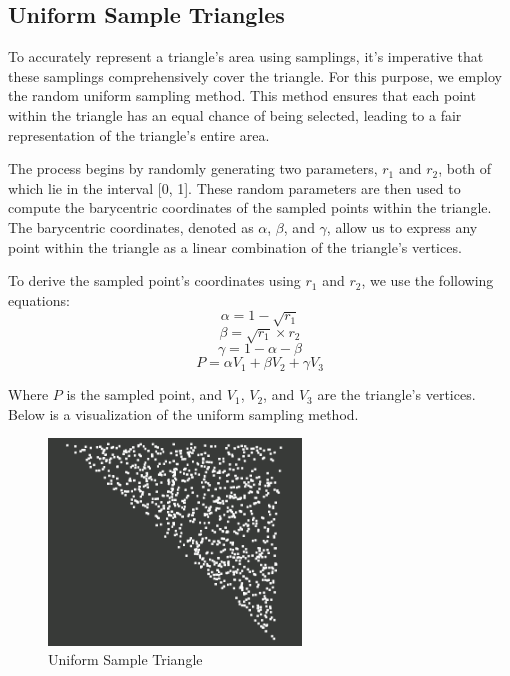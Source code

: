 \documentclass[11pt, a4paper,oneside,chapterprefix=false]{scrbook}
\begin{document}
\subsection{Uniform Sample Triangles}

To accurately represent a triangle's area using samplings, it's imperative that these samplings comprehensively cover the triangle. For this purpose, we employ the random uniform sampling method. This method ensures that each point within the triangle has an equal chance of being selected, leading to a fair representation of the triangle's entire area.

\vspace{10pt}

The process begins by randomly generating two parameters, \( r_1 \) and \( r_2 \), both of which lie in the interval [0, 1]. These random parameters are then used to compute the barycentric coordinates of the sampled points within the triangle. The barycentric coordinates, denoted as \( \alpha \), \( \beta \), and \( \gamma \), allow us to express any point within the triangle as a linear combination of the triangle's vertices.

\vspace{10pt}

To derive the sampled point's coordinates using \( r_1 \) and \( r_2 \), we use the following equations:
\[ \alpha = 1 - \sqrt{r_1} \]
\[ \beta = \sqrt{r_1} \times r_2 \]
\[ \gamma = 1 - \alpha - \beta \]
\[ P = \alpha V_1 + \beta V_2 + \gamma V_3 \]

Where \( P \) is the sampled point, and \( V_1 \), \( V_2 \), and \( V_3 \) are the triangle's vertices. Below is a visualization of the uniform sampling method.

\begin{minipage}{\textwidth}
	\begin{figure}[H]
		\centering
		\includegraphics*[width=0.6\textwidth]{figures/uniform sample triangle.png}
		\caption{Uniform Sample Triangle}
		\label{fig:uniform sample triangle}
	\end{figure}
\end{minipage}
\end{document}
